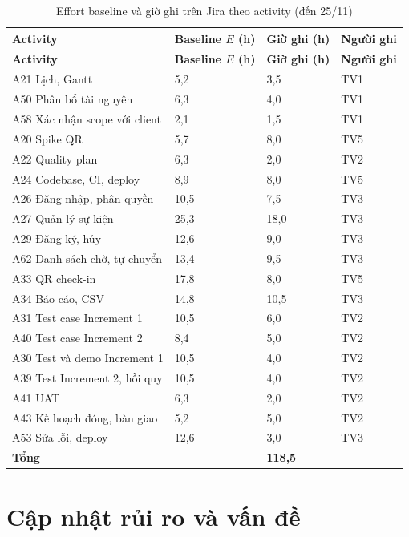 \begingroup\tblsetup\tblzebra
\begin{longtable}{L{4.6cm}L{2.2cm}L{2.6cm}L{3.4cm}}
\caption{Effort baseline và giờ ghi trên Jira theo activity (đến 25/11)}\label{tab:jira-worklog}\\
\toprule
{}\textbf{Activity} & \textbf{Baseline $E$ (h)} & \textbf{Giờ ghi (h)} & \textbf{Người ghi} \\
\midrule
\endfirsthead
\toprule
{}\textbf{Activity} & \textbf{Baseline $E$ (h)} & \textbf{Giờ ghi (h)} & \textbf{Người ghi} \\
\midrule
\endhead
\bottomrule
\endlastfoot
A21 Lịch, Gantt & 5,2 & 3,5 & TV1 \\
A50 Phân bổ tài nguyên & 6,3 & 4,0 & TV1 \\
A58 Xác nhận scope với client & 2,1 & 1,5 & TV1 \\
A20 Spike QR & 5,7 & 8,0 & TV5 \\
A22 Quality plan & 6,3 & 2,0 & TV2 \\
A24 Codebase, CI, deploy & 8,9 & 8,0 & TV5 \\
A26 Đăng nhập, phân quyền & 10,5 & 7,5 & TV3 \\
A27 Quản lý sự kiện & 25,3 & 18,0 & TV3 \\
A29 Đăng ký, hủy & 12,6 & 9,0 & TV3 \\
A62 Danh sách chờ, tự chuyển & 13,4 & 9,5 & TV3 \\
A33 QR check-in & 17,8 & 8,0 & TV5 \\
A34 Báo cáo, CSV & 14,8 & 10,5 & TV3 \\
A31 Test case Increment 1 & 10,5 & 6,0 & TV2 \\
A40 Test case Increment 2 & 8,4 & 5,0 & TV2 \\
A30 Test và demo Increment 1 & 10,5 & 4,0 & TV2 \\
A39 Test Increment 2, hồi quy & 10,5 & 4,0 & TV2 \\
A41 UAT & 6,3 & 2,0 & TV2 \\
A43 Kế hoạch đóng, bàn giao & 5,2 & 5,0 & TV2 \\
A53 Sửa lỗi, deploy & 12,6 & 3,0 & TV3 \\
\midrule
\textbf{Tổng} & & \textbf{118,5} & \\
\end{longtable}
\endgroup

\section{Cập nhật rủi ro và vấn đề}
\label{sec:3-4}
